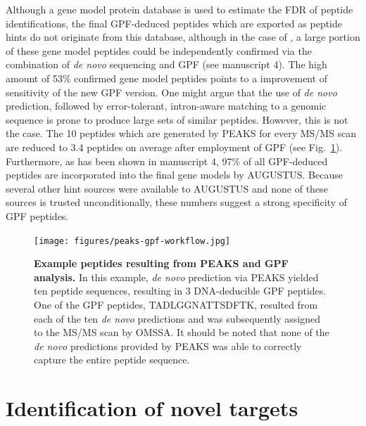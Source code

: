 Although a gene model protein database is used to estimate the FDR of peptide 
identifications, the final GPF-deduced peptides which are exported as
peptide hints do not originate from this database, although in the case
of \cre, a large portion of these gene model peptides could be 
independently confirmed via the combination of {\em de novo} sequencing and 
GPF (see manuscript 4).
The high amount of 53\% confirmed gene model peptides points to a improvement 
of sensitivity of the new GPF version.
One might argue that the use of {\em de novo} prediction, followed by
error-tolerant, intron-aware matching to a genomic sequence is prone to
produce large sets of similar peptides.
However, this is not the case.
The 10 peptides which are generated by PEAKS for every MS/MS scan are 
reduced to 3.4 peptides on average after employment of GPF 
(see Fig.~\ref{fig:peaks-gpf-workflow}).
Furthermore, as has been shown in manuscript 4, 97\% of all GPF-deduced 
peptides are incorporated into the final gene models by AUGUSTUS.
Because several other hint sources were available to AUGUSTUS and none of
these sources is trusted unconditionally, these numbers suggest a strong 
specificity of GPF peptides.

\begin{figure}
\texttt{[image: figures/peaks-gpf-workflow.jpg]}
\caption{
    {\bf Example peptides resulting from PEAKS and GPF analysis.}
    In this example, {\em de novo} prediction via PEAKS yielded
    ten peptide sequences, resulting in 3 DNA-deducible GPF peptides.
    One of the GPF peptides, TADLGGNATTSDFTK, resulted from each of
    the ten {\em de novo} predictions and was subsequently assigned
    to the MS/MS scan by OMSSA.
    It should be noted that none of the {\em de novo} predictions
    provided by PEAKS was able to correctly capture the entire peptide 
    sequence.
}
\label{fig:peaks-gpf-workflow}
\end{figure}


\section{Identification of novel targets}

